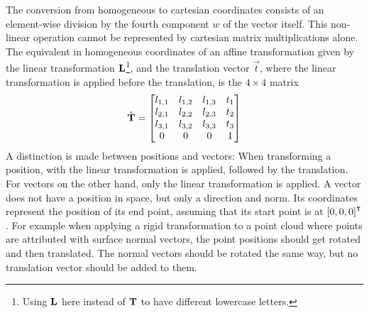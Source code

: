 The conversion from homogeneous to cartesian coordinates consists of an element-wise division by the fourth component $w$ of the vector itself. This non-linear operation cannot be represented by cartesian matrix multiplications alone. The equivalent in homogeneous coordinates of an affine transformation given by the linear transformation $\mathbf{L}$\footnote{Using $\mathbf{L}$ here instead of $\mathbf{T}$ to have different lowercase letters.}, and the translation vector $\vec{t}$, where the linear transformation is applied before the translation, is the $4 \times 4$ matrix
\begin{equation}
	\hat{\mathbf{T}} = \left[ \begin{matrix}
		l_{1,1} & l_{1,2} & l_{1,3} & t_1 \\
		l_{2,1} & l_{2,2} & l_{2,3} & t_2 \\
		l_{3,1} & l_{3,2} & l_{3,3} & t_3 \\
		0 & 0 & 0 & 1
	\end{matrix} \right]
\end{equation}
A distinction is made between positions and vectors: When transforming a position, with the linear transformation is applied, followed by the translation. For vectors on the other hand, only the linear transformation is applied. A vector does not have a position in space, but only a direction and norm. Its coordinates represent the position of its end point, assuming that its start point is at $\left[0, 0, 0\right]^\intercal$. For example when applying a rigid transformation to a point cloud where points are attributed with surface normal vectors, the point positions should get rotated and then translated. The normal vectors should be rotated the same way, but no translation vector should be added to them.

